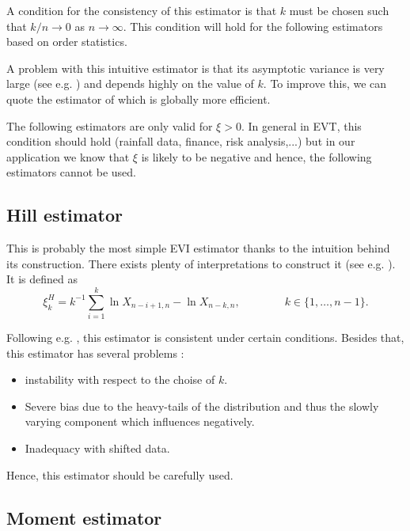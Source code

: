 A condition for the consistency of this estimator is that $k$ must be chosen such that $k/n\rightarrow 0$ as $n\rightarrow \infty$. This condition will hold for the following estimators based on order statistics.

A problem with this intuitive estimator is that its asymptotic variance is very large (see e.g. \cite{dekkers_estimation_1989}) and depends highly on the value of $k$. To improve this, we can quote the estimator of \cite{segers_generalized_2001} which is globally more efficient.%



The following estimators are only valid for $\xi>0$. In general in EVT, this condition should hold (rainfall data, finance, risk analysis,...) but in our application we know that $\xi$ is likely to be negative and hence, the following estimators cannot be used.


\subsection*{Hill estimator}


This is probably the most simple EVI estimator thanks to the intuition behind its construction. There exists plenty of interpretations to construct it (see e.g. \citet[pp.101-104]{beirlant_statistics_2006}). 
It is defined as 
\begin{equation}
\xi^H_{k}=k^{-1}\sum_{i=1}^k\ln X_{n-i+1,n}-\ln X_{n-k,n}, \qquad\qquad k\in\{1,\dots,n-1\}.
\end{equation}



Following e.g. \cite{dehaan_asymp_1998}, this estimator is consistent under certain conditions. Besides that, this estimator has several problems : 

\begin{itemize}
	\item instability with respect to the choise of $k$.
	\item Severe bias due to the heavy-tails of the distribution and thus the slowly varying component which influences negatively.
	\item Inadequacy with shifted data.
\end{itemize}
Hence, this estimator should be carefully used.


\subsection*{Moment estimator}

